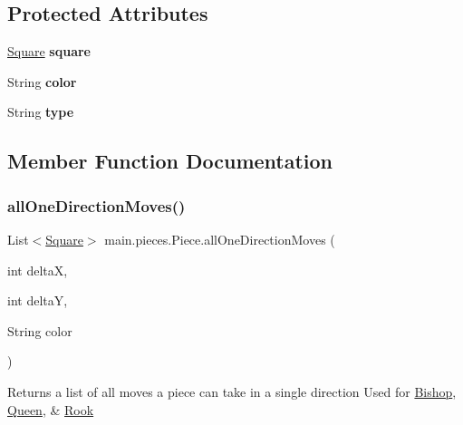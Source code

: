 \subsection*{Protected Attributes}
\begin{DoxyCompactItemize}
\item 
\mbox{\label{classmain_1_1pieces_1_1_piece_aa8b9955e4a1ce43f003b6969906f06b4}} 
\hyperlink{classmain_1_1_square}{Square} {\bfseries square}
\item 
\mbox{\label{classmain_1_1pieces_1_1_piece_adfac16563191967f4158f64fe18d4854}} 
String {\bfseries color}
\item 
\mbox{\label{classmain_1_1pieces_1_1_piece_a31bbb042dedf2d89fa95069ae4ef36f5}} 
String {\bfseries type}
\end{DoxyCompactItemize}


\subsection{Member Function Documentation}
\mbox{\label{classmain_1_1pieces_1_1_piece_a658f7f763d86a73dda37d4e1ecf6a451}} 
\subsubsection{\texorpdfstring{all\+One\+Direction\+Moves()}{allOneDirectionMoves()}}
{\footnotesize\ttfamily List$<$\hyperlink{classmain_1_1_square}{Square}$>$ main.\+pieces.\+Piece.\+all\+One\+Direction\+Moves (\begin{DoxyParamCaption}\item[{int}]{deltaX,  }\item[{int}]{deltaY,  }\item[{String}]{color }\end{DoxyParamCaption})\hspace{0.3cm}{\ttfamily [inline]}}

Returns a list of all moves a piece can take in a single direction Used for \hyperlink{classmain_1_1pieces_1_1_bishop}{Bishop}, \hyperlink{classmain_1_1pieces_1_1_queen}{Queen}, \& \hyperlink{classmain_1_1pieces_1_1_rook}{Rook} \mbox{\label{classmain_1_1pieces_1_1_piece_a227ebaf4d456aa773b0ba90754572728}} 
